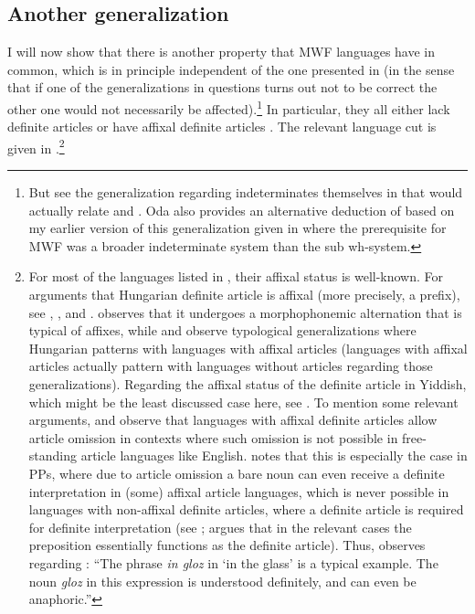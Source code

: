 \documentclass[output=paper,colorlinks,citecolor=brown]{langscibook}
\begin{document}
\subsection{Another generalization}\label{sec:bosk:2.1}

I will now show that there is another property that MWF languages have in common, which is in principle independent of the one presented in  (in the sense that if one of the generalizations in questions turns out not to be correct the other one would not necessarily be affected).\footnote{But see the generalization regarding indeterminates themselves in \citet{Oda2022} that would actually relate  and . Oda also provides an alternative deduction of  based on my earlier version of this generalization given in \citet{Bošković2020} where the prerequisite for MWF was a broader indeterminate system than the sub wh-system.} In particular, they all either lack definite articles or have affixal definite articles . The relevant language cut is given in .\footnote{\label{fnt:ftn11}For most of the languages listed in , their affixal status is well-known. For arguments that Hungarian definite article is affixal (more precisely, a prefix), see \citet{MacWhinney1976}, \citet{Oda2022}, and \citet{Lewis2024}. \citeauthor{MacWhinney1976} observes that it undergoes a morphophonemic alternation that is typical of affixes, while \citeauthor{Oda2022} and \citeauthor{Lewis2024} observe typological generalizations where Hungarian patterns with languages with affixal articles (languages with affixal articles actually pattern with languages without articles regarding those generalizations). Regarding the affixal status of the definite article in Yiddish, which might be the least discussed case here, see \citet{Oda2022}. To mention some relevant arguments, \citet{Talić2017} and \citet{Oda2022} observe that languages with affixal definite articles allow article omission in contexts where such omission is not possible in free-standing article languages like English. \citeauthor{Oda2022} notes that this is especially the case in PPs, where due to article omission a bare noun can even receive a definite interpretation in (some) affixal article languages, which is never possible in languages with non-affixal definite articles, where a definite article is required for definite interpretation (see \citealt{Bošković2016}; \citeauthor{Oda2022} argues that in the relevant cases the preposition essentially functions as the definite article). Thus, \citet[119]{Zwicky1984} observes regarding : ``The phrase \textit{in gloz} in `in the glass' is a typical example. The noun \textit{gloz} in this expression is understood definitely, and can even be anaphoric.''

}
\end{document}
